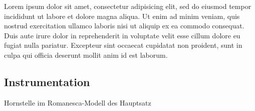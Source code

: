Lorem ipsum dolor sit amet, consectetur adipisicing elit, sed do eiusmod tempor incididunt ut labore et dolore magna aliqua. Ut enim ad minim veniam, quis nostrud exercitation ullamco laboris nisi ut aliquip ex ea commodo consequat. Duis aute irure dolor in reprehenderit in voluptate velit esse cillum dolore eu fugiat nulla pariatur. Excepteur sint occaecat cupidatat non proident, sunt in culpa qui officia deserunt mollit anim id est laborum.



\subsection{Instrumentation}

Hornstelle im Romanesca-Modell des Hauptsatz

